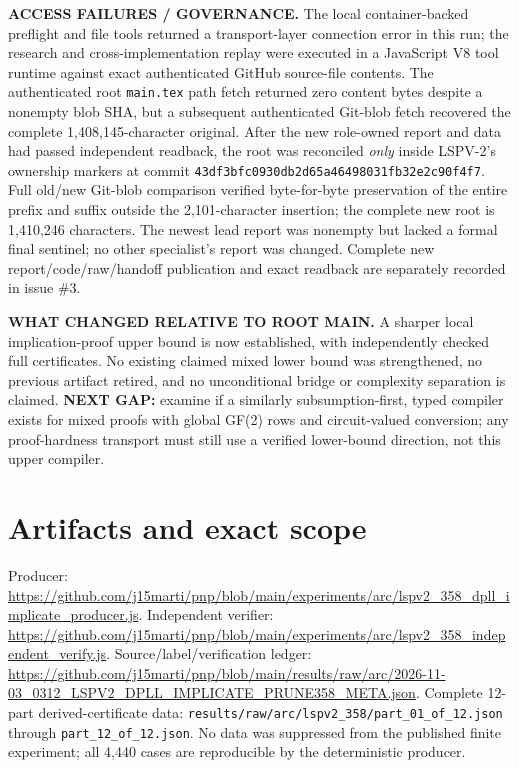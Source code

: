 \documentclass[11pt]{article}
\begin{document}
\noindent\textbf{ACCESS FAILURES / GOVERNANCE.} The local container-backed preflight and file tools returned a transport-layer connection error in this run; the research and cross-implementation replay were executed in a JavaScript V8 tool runtime against exact authenticated GitHub source-file contents. The authenticated root \texttt{main.tex} path fetch returned zero content bytes despite a nonempty blob SHA, but a subsequent authenticated Git-blob fetch recovered the complete 1,408,145-character original. After the new role-owned report and data had passed independent readback, the root was reconciled \emph{only} inside LSPV-2's ownership markers at commit \texttt{43df3bfc0930db2d65a46498031fb32e2c90f4f7}. Full old/new Git-blob comparison verified byte-for-byte preservation of the entire prefix and suffix outside the 2,101-character insertion; the complete new root is 1,410,246 characters. The newest lead report was nonempty but lacked a formal final sentinel; no other specialist's report was changed. Complete new report/code/raw/handoff publication and exact readback are separately recorded in issue \#3.

\noindent\textbf{WHAT CHANGED RELATIVE TO ROOT MAIN.} A sharper local implication-proof upper bound is now established, with independently checked full certificates. No existing claimed mixed lower bound was strengthened, no previous artifact retired, and no unconditional bridge or complexity separation is claimed. \textbf{NEXT GAP:} examine if a similarly subsumption-first, typed compiler exists for mixed proofs with global GF(2) rows and circuit-valued conversion; any proof-hardness transport must still use a verified lower-bound direction, not this upper compiler.

\section*{Artifacts and exact scope}
Producer: \url{https://github.com/j15marti/pnp/blob/main/experiments/arc/lspv2_358_dpll_implicate_producer.js}.
Independent verifier: \url{https://github.com/j15marti/pnp/blob/main/experiments/arc/lspv2_358_independent_verify.js}.
Source/label/verification ledger: \url{https://github.com/j15marti/pnp/blob/main/results/raw/arc/2026-11-03_0312_LSPV2_DPLL_IMPLICATE_PRUNE358_META.json}.
Complete 12-part derived-certificate data: \texttt{results/raw/arc/lspv2\_358/part\_01\_of\_12.json} through \texttt{part\_12\_of\_12.json}. No data was suppressed from the published finite experiment; all 4,440 cases are reproducible by the deterministic producer.
\end{document}
